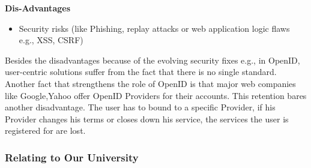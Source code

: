 \documentclass[12pt]{report}
\begin{document}
	\textbf{Dis-Advantages}
	\begin{itemize}
	\item Security risks (like Phishing, replay attacks or web application logic flaws e.g., XSS, CSRF)
	\end{itemize}
	Besides the disadvantages because of the evolving security fixes e.g., in OpenID, user-centric solutions suffer from the fact that there is no
	single standard. Another fact that strengthens the role of OpenID is that major web companies like Google,Yahoo offer OpenID Providers for their accounts. This retention bares another disadvantage. The user has to bound to a specific Provider, if his Provider changes his terms or closes down his service, the services the user is registered for are lost.

\subsubsection{Relating to Our University}
\end{document}
